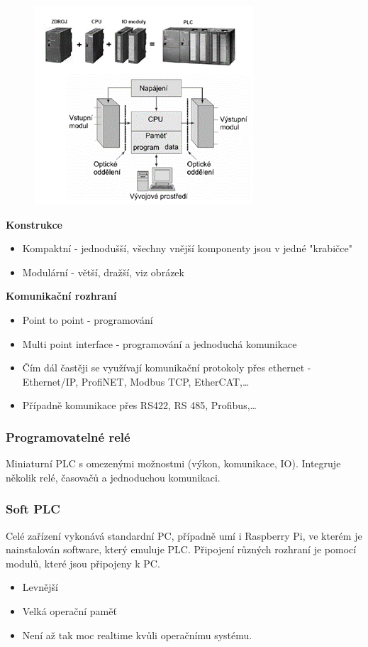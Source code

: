 \begin{itemize}
\begin{figure}[h]
  \begin{center}
    \includegraphics[scale = 1]{img/Picture13.png}
  \end{center}
\end{figure}

\textbf{Konstrukce}
\begin{itemize}
  \item Kompaktní - jednodušší, všechny vnější komponenty jsou v jedné "krabičce"
  \item Modulární - větší, dražší, viz obrázek
\end{itemize}

\textbf{Komunikační rozhraní}
\begin{itemize}
  \item Point to point - programování
  \item Multi point interface - programování a jednoduchá komunikace
  \item Čím dál častěji se využívají komunikační protokoly přes ethernet - Ethernet/IP, ProfiNET, Modbus TCP, EtherCAT,\dots
  \item Případně komunikace přes RS422, RS 485, Profibus,\dots
\end{itemize}

\subsubsection*{Programovatelné relé}
Miniaturní PLC s omezenými možnostmi (výkon, komunikace, IO). Integruje několik relé, časovačů a jednoduchou komunikaci.

\subsubsection*{Soft PLC}
Celé zařízení vykonává standardní PC, případně umí i Raspberry Pi, ve kterém je nainstalován software, který emuluje PLC. Připojení různých rozhraní je pomocí modulů, které jsou připojeny k PC. 
\begin{itemize}
  \item Levnější
  \item Velká operační paměť
  \item Není až tak moc realtime kvůli operačnímu systému.
\end{itemize}


\end{itemize}
